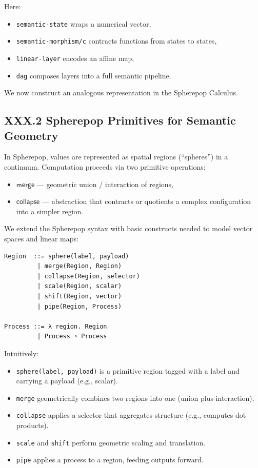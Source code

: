 \documentclass[12pt,letterpaper]{article}
\begin{document}
Here:

\begin{itemize}
  \item \texttt{semantic-state} wraps a numerical vector,
  \item \texttt{semantic-morphism/c} contracts functions from states to states,
  \item \texttt{linear-layer} encodes an affine map,
  \item \texttt{dag} composes layers into a full semantic pipeline.
\end{itemize}

We now construct an analogous representation in the Spherepop Calculus.

\subsection{XXX.2 Spherepop Primitives for Semantic Geometry}

In Spherepop, values are represented as spatial regions (``spheres'') in a continuum. Computation proceeds via two primitive operations:

\begin{itemize}
  \item $\mathsf{merge}$ --- geometric union / interaction of regions,
  \item $\mathsf{collapse}$ --- abstraction that contracts or quotients a complex configuration into a simpler region.
\end{itemize}

We extend the Spherepop syntax with basic constructs needed to model vector spaces and linear maps:

\begin{verbatim}
Region  ::= sphere(label, payload)
         | merge(Region, Region)
         | collapse(Region, selector)
         | scale(Region, scalar)
         | shift(Region, vector)
         | pipe(Region, Process)

Process ::= λ region. Region
         | Process ∘ Process
\end{verbatim}

Intuitively:

\begin{itemize}
  \item \verb|sphere(label, payload)| is a primitive region tagged with a label and carrying a payload (e.g., scalar).
  \item \verb|merge| geometrically combines two regions into one (union plus interaction).
  \item \verb|collapse| applies a selector that aggregates structure (e.g., computes dot products).
  \item \verb|scale| and \verb|shift| perform geometric scaling and translation.
  \item \verb|pipe| applies a process to a region, feeding outputs forward.
\end{itemize}
\end{document}
